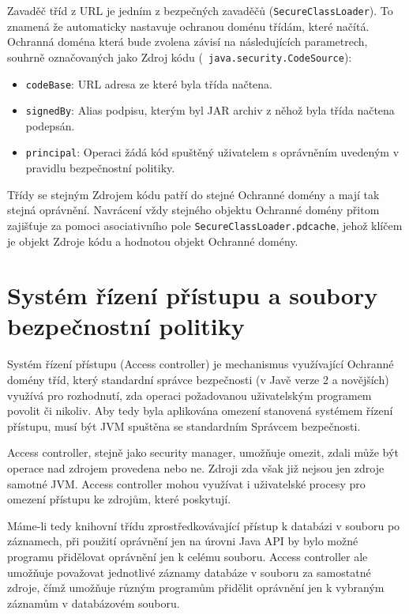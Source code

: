 Zavaděč tříd z URL je jedním z bezpečných zavaděčů ({\tt SecureClassLoader}). To znamená že automaticky nastavuje ochranou doménu třídám, které načítá.
Ochranná doména která bude zvolena závisí na následujících parametrech, souhrně označovaných jako Zdroj kódu ({\tt 
java.security.CodeSource}): \cite{refPolicyFiles}

\begin{itemize}
  \item {\tt codeBase}: URL adresa ze které byla třída načtena.
  \item {\tt signedBy}: Alias podpisu, kterým byl JAR archiv z něhož byla třída načtena podepsán.
  \item {\tt principal}: Operaci žádá kód spuštěný uživatelem s oprávněním uvedeným v pravidlu bezpečnostní politiky.
\end{itemize}

Třídy se stejným Zdrojem kódu patří do stejné Ochranné domény a mají tak stejná oprávnění. Navrácení vždy stejného objektu Ochranné domény přitom zajišťuje za pomoci asociativního pole {\tt SecureClassLoader.pdcache}, jehož klíčem je objekt Zdroje kódu a hodnotou objekt Ochranné domény. \cite{sourceSecureClassLoader}

\section{Systém řízení přístupu a soubory bezpečnostní politiky}

Systém řízení přístupu (Access controller) je mechanismus využívající Ochranné domény tříd, který standardní správce bezpečnosti (v Javě verze 2 a novějších) využívá pro rozhodnutí, zda operaci požadovanou uživatelským programem povolit či nikoliv. Aby tedy byla aplikována omezení stanovená systémem řízení přístupu, musí být JVM spuštěna se standardním Správcem bezpečnosti. \cite[5]{oaks}

Access controller, stejně jako security manager, umožňuje omezit, zdali může být operace nad zdrojem provedena nebo ne. Zdroji zda však již nejsou jen zdroje samotné JVM. Access controller mohou využívat i uživatelské procesy pro omezení přístupu ke zdrojům, které poskytují. \cite[5]{oaks}

Máme-li tedy knihovní třídu zprostředkovávající přístup k databázi v souboru po záznamech, při použití oprávnění jen na úrovni Java API by bylo možné programu přidělovat oprávnění jen k celému souboru. Access controller ale umožňuje považovat jednotlivé záznamy databáze v souboru za samostatné zdroje, čímž umožňuje různým programům přidělit oprávnění jen k vybraným záznamům v databázovém souboru.

